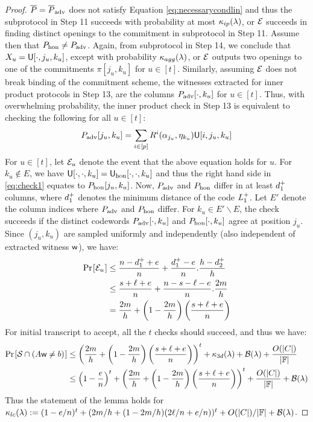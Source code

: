 \begin{proof}
$\overline{P}=\overline{P}_{\rm adv}$ does not satisfy Equation
\eqref{eq:necessarycondlin} and thus the subprotocol in Step 11 succeeds with
probability at most $\kappa_{ip}(\lambda)$, or $\mathcal{E}$ succeeds in finding
distinct openings to the commitment in subprotocol in Step 11. Assume then that $P_{\rm hon}\neq
P_{\rm adv}$. Again, from subprotocol in Step 14, we conclude that $X_u =
\mathsf{U}[\cdot,j_u,k_u]$, except with probability $\kappa_{agg}(\lambda)$, or
$\mathcal{E}$ outputs two openings to one of the commitments $\pi[j_u,k_u]$ for $u\in
[t]$. Similarly, assuming $\mathcal{E}$ does not break binding of the commitment
scheme, the witnesses extracted for inner product protocols in Step 13, are the
columns $P_{\rm adv}[\cdot,k_u]$ for $u\in [t]$. Thus, with overwhelming probability, the inner product check in Step 13 is
equivalent to checking the following for all $u\in [t]$:
\begin{equation}\label{eq:check1}
P_{\rm adv}[j_u,k_u]=\sum_{i\in
[p]}R^i(\alpha_{j_u},\eta_{k_u})\mathsf{U}[i,j_u,k_u]
\end{equation}
For $u\in [t]$, let $\mathcal{E}_u$ denote the event that the above equation holds
for $u$. For $k_u\not\in E$, we have $\mathsf{U}[\cdot,\cdot,k_u]=\mathsf{U}_{\rm
hon}[\cdot,\cdot,k_u]$ and thus the right hand side in \eqref{eq:check1} equates
to $P_{\rm hon}[j_u,k_u]$. Now, $P_{\rm adv}$ and $P_{\rm hon}$ differ in at
least $d^{+}_1$ columns, where $d^{+}_1$ denotes the minimum distance of the
code $L^{+}_1$. Let $E'$ denote the column indices where $P_{\rm adv}$ and
$P_{\rm hon}$ differ. For $k_u\in E'\backslash E$, the check succeeds if the
distinct codewords $P_{\rm adv}[\cdot,k_u]$ and $P_{\rm hon}[\cdot,k_u]$ agree
at position $j_u$. Since $(j_u,k_u)$ are sampled uniformly and independently
(also independent of extracted witness $\mathsf{w}$), we have:
{\small
\begin{align}\label{eq:probeq6}
\prob{\mc{E}_u} &\leq \frac{n-\dashD_1+e}{n} +
\frac{\dashD_1-e}{n}.\frac{h-\dashD_2}{h}
\nonumber \\
	&\leq \frac{s+\ell+e}{n} + \frac{n-s-\ell-e}{n}.\frac{2m}{h} \nonumber \\
	& = \frac{2m}{h} +
\left(1-\frac{2m}{h}\right)\left(\frac{s+\ell+e}{n}\right)
\end{align}
}
For initial transcript to accept, all the $t$ checks should succeed, and thus we
have:
{\small
\begin{align}\label{eq:probeq7}
\prob{\mc{S}\cap (A\wit\neq b)}&\leq
\left(\frac{2m}{h}+\left(1-\frac{2m}{h}\right)\left(\frac{s+\ell+e}{n}\right)\right)^t
+ \kappa_{3d}(\secpar) + \mc{B}(\secpar) +
\frac{O(|C|)}{|\FF|} \nonumber \\
&\leq \left(1-\frac{e}{n}\right)^t +
\left(\frac{2m}{h}+\left(1-\frac{2m}{h}\right)\left(\frac{s+\ell+e}{n}\right)\right)^t
+ \frac{O(|C|)}{|\FF|} + \mc{B}(\secpar)
\end{align}
}
Thus the statement of the lemma holds for $\kappa_{lc}(\lambda) := (1-e/n)^t +
(2m/h + (1-2m/h)(2\ell/n + e/n))^t+O(|C|)/|\mathbb{F}|+\mathcal{B}(\lambda)$.
\end{proof}


